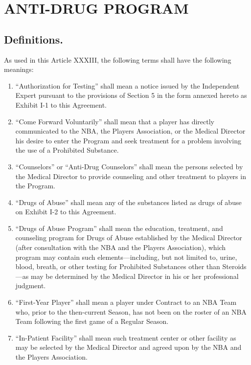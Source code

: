 \documentclass[
]{book}
\providecommand{\tightlist}{%
  \setlength{\itemsep}{0pt}\setlength{\parskip}{0pt}}
\begin{document}
\hypertarget{anti-drug-program}{%
\chapter{ANTI-DRUG PROGRAM}\label{anti-drug-program}}

\hypertarget{definitions.-1}{%
\section{Definitions.}\label{definitions.-1}}

As used in this Article XXXIII, the following terms shall have the following meanings:

\begin{enumerate}
\def\labelenumi{(\alph{enumi})}
\tightlist
\item
  ``Authorization for Testing'' shall mean a notice issued by the Independent Expert pursuant to the provisions of Section 5 in the form annexed hereto as Exhibit I-1 to this Agreement.
\item
  ``Come Forward Voluntarily'' shall mean that a player has directly communicated to the NBA, the Players Association, or the Medical Director his desire to enter the Program and seek treatment for a problem involving the use of a Prohibited Substance.
\item
  ``Counselors'' or ``Anti-Drug Counselors'' shall mean the persons selected by the Medical Director to provide counseling and other treatment to players in the Program.
\item
  ``Drugs of Abuse'' shall mean any of the substances listed as drugs of abuse on Exhibit I-2 to this Agreement.
\item
  ``Drugs of Abuse Program'' shall mean the education, treatment, and counseling program for Drugs of Abuse established by the Medical Director (after consultation with the NBA and the Players Association), which program may contain such elements---including, but not limited to, urine, blood, breath, or other testing for Prohibited Substances other than Steroids---as may be determined by the Medical Director in his or her professional judgment.
\item
  ``First-Year Player'' shall mean a player under Contract to an NBA Team who, prior to the then-current Season, has not been on the roster of an NBA Team following the first game of a Regular Season.
\item
  ``In-Patient Facility'' shall mean such treatment center or other facility as may be selected by the Medical Director and agreed upon by the NBA and the Players Association.

\end{enumerate}
\end{document}
